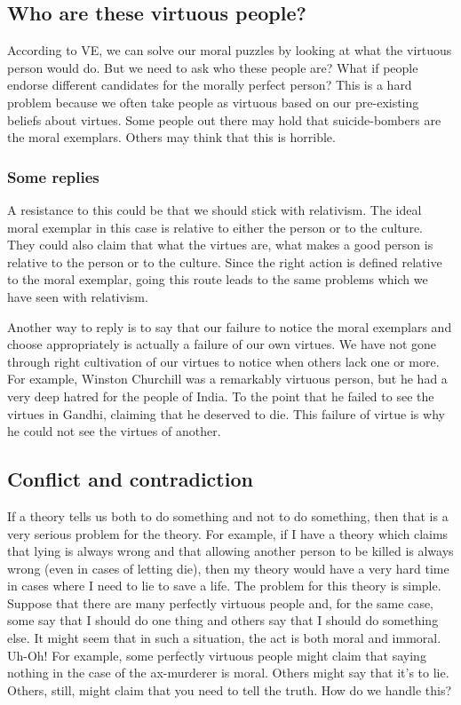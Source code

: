 \subsection{Who are these virtuous people?}

According to VE, we can solve our moral puzzles by looking at what the virtuous person would do. But we need to ask who these people are? What if people endorse different candidates for the morally perfect person? This is a hard problem because we often take people as virtuous based on our pre-existing beliefs about virtues. Some people out there may hold that suicide-bombers are the moral exemplars. Others may think that this is horrible.
\subsubsection{Some replies}

A resistance to this could be that we should stick with relativism. The ideal moral exemplar in this case is relative to either the person or to the culture. They could also claim that what the virtues are, what makes a good person is relative to the person or to the culture. Since the right action  is defined relative to the moral exemplar, going this route leads to the same problems which we have seen with relativism.

Another way to reply is to say that our failure to notice the moral exemplars and choose appropriately is actually a failure of our own virtues. We have not gone through right cultivation of our virtues to notice when others lack one or more. For example, Winston Churchill was a remarkably virtuous person, but he had a very deep hatred for the people of India. To the point that he failed to see the virtues in Gandhi, claiming that he deserved to die. This failure of virtue is why he could not see the virtues of another.  
\subsection{Conflict and contradiction}

If a theory tells us both to do something and not to do something, then that is a very serious problem for the theory. For example, if I have a theory which claims that lying is always wrong and that allowing another person to be killed is always wrong (even in cases of letting die), then my theory would have a very hard time in cases where I need to lie to save a life. The problem for this theory is simple. Suppose that there are many perfectly virtuous people and, for the same case, some say that I should do one thing and others say that I should do something else. It might seem that in such a situation, the act is both moral and immoral. Uh-Oh! For example, some perfectly virtuous people might claim that saying nothing in the case of the ax-murderer is moral. Others might say that it’s to lie. Others, still, might claim that you need to tell the truth. How do we handle this?
